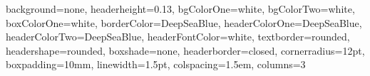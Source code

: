 \documentclass[portrait,paperwidth=65cm,paperheight=126cm,fontscale=0.35,dvipsnames]{baposter}
\begin{document}
\begin{poster}
{
  background=none,
  headerheight=0.13\textheight,
  bgColorOne=white,
  bgColorTwo=white,
  boxColorOne=white,
  borderColor=DeepSeaBlue,
  headerColorOne=DeepSeaBlue,
  headerColorTwo=DeepSeaBlue,
  headerFontColor=white,
  textborder=rounded,
  headershape=rounded,
  boxshade=none,
  headerborder=closed,
  cornerradius=12pt,
  boxpadding=10mm,
  linewidth=1.5pt,
  colspacing=1.5em,
  columns=3
}
{\posterLogoLeft}
{\posterHeader \posterFooter \posterTitle}
{\posterAuthors}
{\posterLogoRight}



\end{poster}
\end{document}
